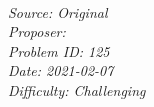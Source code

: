 \SSbreak\\
\emph{Source: Original}\\
\emph{Proposer: \Ptan}\\ %
\emph{Problem ID: 125}\\
\emph{Date: 2021-02-07}\\
\emph{Difficulty: Challenging}\\
\SSbreak

\bigskip

\begin{solution}\hfil\medskip
	
\end{solution}\bigskip

